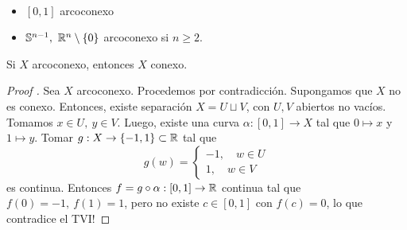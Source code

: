 \begin{eg}~
	\begin{itemize}
		\item $[0,1]$ arcoconexo

		\item $\mathbb{S}^{n-1},\ \mathbb{R}^n \setminus \{0\}$ arcoconexo si $n \geq 2$.
	\end{itemize}
\end{eg}

\begin{prop}
	Si $X$ arcoconexo, entonces $X$ conexo.
\end{prop}
\begin{proof}[Proof ]
	Sea $X$ arcoconexo. Procedemos por contradicción. Supongamos que $X$ no es conexo. Entonces, existe separación $X = U \sqcup V$, con $U,V$ abiertos no vacíos. Tomamos $x \in U,\ y \in V$. Luego, existe una curva $\alpha : [0,1] \to X$ tal que $0 \mapsto x$ y $1 \mapsto y$. Tomar $g : X \to \{-1,1\} \subset \mathbb{R}$ tal que
	\[ g(w) = \begin{cases}
		-1, \quad w \in U \\
		1, \quad w \in V
	\end{cases} \]
	es continua. Entonces $f = g \circ \alpha : [0,1] \to \mathbb{R}$ continua tal que $f(0) = -1,\ f(1) = 1$, pero no existe $c \in [0,1]$ con $f(c) = 0$, lo que contradice el TVI!
\end{proof}
